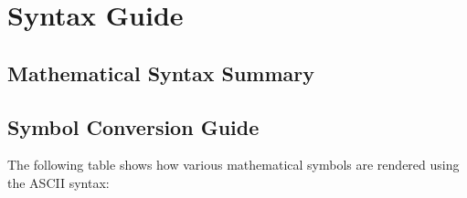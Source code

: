 \section{Syntax Guide}

\subsection{Mathematical Syntax Summary}

\VARMATHSYNTAX

\TYPEMATHSYNTAX

\EXPRMATHSYNTAX

\PREDMATHSYNTAX

\newpage
\subsection{Symbol Conversion Guide}

The following table shows how various mathematical symbols are rendered using
the ASCII syntax:

